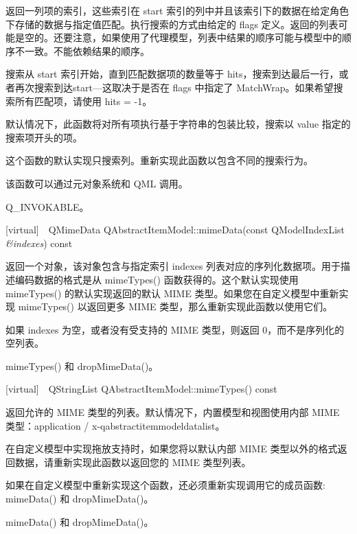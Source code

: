 返回一列项的索引，这些索引在 start 索引的列中并且该索引下的数据在给定角色下存储的数据与指定值匹配。执行搜索的方式由给定的 flags 定义。返回的列表可能是空的。还要注意，如果使用了代理模型，列表中结果的顺序可能与模型中的顺序不一致。不能依赖结果的顺序。

搜索从 start 索引开始，直到匹配数据项的数量等于 hits，搜索到达最后一行，或者再次搜索到达start—这取决于是否在 flags 中指定了 MatchWrap。如果希望搜索所有匹配项，请使用 hits = -1。

默认情况下，此函数将对所有项执行基于字符串的包装比较，搜索以 value 指定的搜索项开头的项。 

\begin{notice}
这个函数的默认实现只搜索列。重新实现此函数以包含不同的搜索行为。
\end{notice}

\begin{notice}
该函数可以通过元对象系统和 QML 调用。
\end{notice}

\begin{seeAlso}
Q\_INVOKABLE。
\end{seeAlso}

[virtual] QMimeData QAbstractItemModel::mimeData(const QModelIndexList \emph{\&indexes}) const

返回一个对象，该对象包含与指定索引 indexes 列表对应的序列化数据项。用于描述编码数据的格式是从 mimeTypes() 函数获得的。这个默认实现使用 mimeTypes() 的默认实现返回的默认 MIME 类型。如果您在自定义模型中重新实现 mimeTypes() 以返回更多 MIME 类型，那么重新实现此函数以使用它们。

如果 indexes 为空，或者没有受支持的 MIME 类型，则返回 0，而不是序列化的空列表。

\begin{seeAlso}
mimeTypes() 和 dropMimeData()。
\end{seeAlso}

[virtual] QStringList QAbstractItemModel::mimeTypes() const

返回允许的 MIME 类型的列表。默认情况下，内置模型和视图使用内部 MIME 类型：application / x-qabstractitemmodeldatalist。

在自定义模型中实现拖放支持时，如果您将以默认内部 MIME 类型以外的格式返回数据，请重新实现此函数以返回您的 MIME 类型列表。

如果在自定义模型中重新实现这个函数，还必须重新实现调用它的成员函数: mimeData() 和 dropMimeData()。

\begin{seeAlso}
mimeData() 和 dropMimeData()。
\end{seeAlso}

